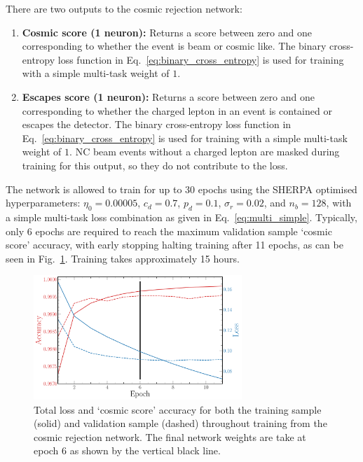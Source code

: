 There are two outputs to the cosmic rejection network:
\begin{enumerate}
    \item \textbf{Cosmic score (1 neuron):} Returns a score between zero and one corresponding to
          whether the event is beam or cosmic like. The binary cross-entropy loss function in
          Eq.~\ref{eq:binary_cross_entropy} is used for training with a simple multi-task weight
          of $1$.
    \item \textbf{Escapes score (1 neuron):} Returns a score between zero and one corresponding to
          whether the charged lepton in an event is contained or escapes the detector. The binary
          cross-entropy loss function in Eq.~\ref{eq:binary_cross_entropy} is used for training
          with a simple multi-task weight of $1$. NC beam events without a charged lepton are
          masked during training for this output, so they do not contribute to the loss.
\end{enumerate}

The network is allowed to train for up to 30 epochs using the SHERPA optimised hyperparameters:
$\eta_{0}=0.00005$, $c_{d}=0.7$, $p_{d}=0.1$, $\sigma_{r}=0.02$, and $n_{b}=128$, with a simple
multi-task loss combination as given in Eq.~\ref{eq:multi_simple}. Typically, only 6 epochs are
required to reach the maximum validation sample `cosmic score' accuracy, with early stopping
halting training after 11 epochs, as can be seen in Fig.~\ref{fig:final_cosmic_history}. Training
takes approximately 15 hours.

\begin{figure} %
    \includegraphics[width=0.7\textwidth]{diagrams/6-cvn/chipsnet/final_cosmic_history.pdf}
    \caption[Loss and accuracy throughout training for the cosmic rejection network.]
    {Total loss and `cosmic score' accuracy for both the training sample (solid) and validation
        sample (dashed) throughout training from the cosmic rejection network. The final network
        weights are take at epoch 6 as shown by the vertical black line.}
    \label{fig:final_cosmic_history}
\end{figure}

